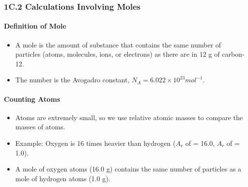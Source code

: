 
\subsubsection{1C.2 Calculations Involving Moles}
\paragraph{Definition of Mole}
\begin{itemize}
    \item A mole is the amount of substance that contains the same number of particles (atoms, molecules, ions, or electrons) as
    there are in 12 \unit{g} of carbon-12.
    \item The number is the Avogadro constant, $N_A = 6.022 \times 10^{23} \unit{mol^{-1}}$.
\end{itemize}

\paragraph{Counting Atoms}
\begin{itemize}
    \item Atoms are extremely small, so we use relative atomic masses to compare the masses of atoms.
    \item Example: Oxygen is 16 times heavier than hydrogen ($A_r$ of  = 16.0, $A_r$ of  = 1.0).
    \item A mole of oxygen atoms (16.0 \unit{g}) contains the same number of particles as a mole of hydrogen atoms (1.0 \unit{g}).
\end{itemize}

